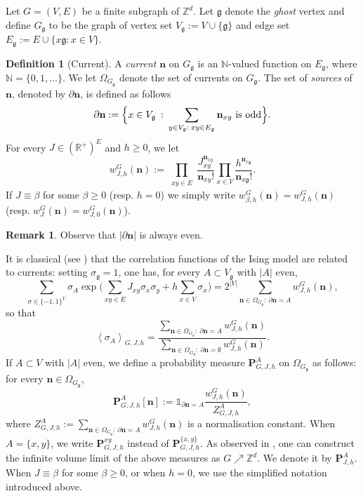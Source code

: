 \documentclass[11pt,a4paper]{article}
\numberwithin{equation}{section}
\theoremstyle{plain}
\theoremstyle{definition}
\newtheorem{Def}[Thm]{Definition}
\newtheorem{Rem}[Thm]{Remark}
\newcommand\n{\mathbf{n}}
\newcommand\sn{\partial\mathbf{n}}
\newcommand\fg{\mathfrak{g}}
\begin{document}
Let $G=(V,E)$ be a finite subgraph of $\mathbb Z^d$. Let $\mathfrak{g}$ denote the \emph{ghost} vertex and define $G_{\mathfrak{g}}$ to be the graph of vertex set $V_\mathfrak{g}:=V\cup \{\mathfrak{g}\}$ and edge set $E_{\mathfrak{g}}:=E\cup \{x\mathfrak{g}: x\in V\}$.
\begin{Def}[Current] A \textit{current} $\n$ on $G_\fg$ is an $\mathbb N$-valued function on $E_\fg$, where $\mathbb N=\lbrace 0,1,\ldots\rbrace$. We let $\Omega_{G_\fg}$ denote the set of currents on $G_\fg$. The set of \emph{sources} of $\n$, denoted by $\sn$, is defined as follows
\begin{equation}
\sn:=\Big\{ x \in V_\fg \: : \: \sum_{y\in V_\fg:\: xy\in E_\fg}\n_{xy}\textup{ is odd}\Big\}.
\end{equation}
For every $J\in (\mathbb R^+)^E$ and $h\geq 0$, we let
\begin{equation}
w_{J,h}^G(\n):=\prod_{\substack{xy\in E}}\dfrac{J_{xy}^{\n_{xy}}}{\n_{xy}!}\prod_{x\in V}\frac{h^{\n_{x\fg}}}{\n_{x\fg}!}.
\end{equation}
If $J\equiv \beta$ for some $\beta\geq 0$ (resp. $h=0$) we simply write $w_{\beta,h}^G(\n)=w_{J,h}^G(\n)$ (resp. $w_{J}^G(\n)=w_{J,0}^G(\n)$). 
\end{Def}
\begin{Rem} Observe that $|\sn|$ is always even.
\end{Rem}

It is classical (see \cite{AizenmanGeometricAnalysis1982,DuminilLecturesOnIsingandPottsModels2019,Panis2024applications}) that the correlation functions of the Ising model are related to currents: setting $\sigma_{\fg}=1$, one has, for every $A\subset V_\fg$ with $|A|$ even, 
\begin{equation}\label{eq: relation partition functions}
	\sum_{\sigma\in \{-1,1\}^V}\sigma_A \exp\Big(\sum_{xy\in E}J_{xy}\sigma_x\sigma_y+h\sum_{x\in V}\sigma_x\Big)=2^{|V|}\sum_{\n\in \Omega_{G_\fg}:\: \sn=A}w^G_{J,h}(\n),
\end{equation}
so that
\begin{equation}\label{equation correlation rcr}
\left\langle \sigma_A\right\rangle_{G,J,h}=\dfrac{\sum_{\n\in \Omega_{G_\fg}:\:\sn=A}w_{J,h}^G(\n)}{\sum_{\n\in \Omega_{G_\fg}:\:\sn=\emptyset}w_{J,h}^G(\n)}. 
\end{equation}
If $A\subset V$ with $|A|$ even, we define a probability measure $\mathbf{P}_{G,J,h}^A$ on $\Omega_{G_\fg}$ as follows: for every $\n\in \Omega_{G_\fg}$, 
\begin{equation}
    \mathbf{P}_{G,J,h}^A[\n]:=\mathds{1}_{\sn=A}\frac{w_{J,h}^G(\n)}{Z_{G,J,h}^A},
\end{equation}
where $Z_{G,J,h}^A:=\sum_{\n\in \Omega_{G_\fg}:\:\sn=A}w_{J,h}^G(\n)$ is a normalisation constant. When $A=\lbrace x,y\rbrace$, we write $\mathbf{P}^{xy}_{G,J,h}$ instead of $\mathbf{P}^{\{x,y\}}_{G,J,h}$. As observed in \cite{AizenmanDuminilSidoraviciusContinuityIsing2015}, one can construct the infinite volume limit of the above measures as $G\nearrow \mathbb Z^d$. We denote it by $\mathbf P_{J,h}^A$. When $J\equiv\beta$ for some $\beta\geq 0$, or when $h=0$, we use the simplified notation introduced above.
\end{document}
